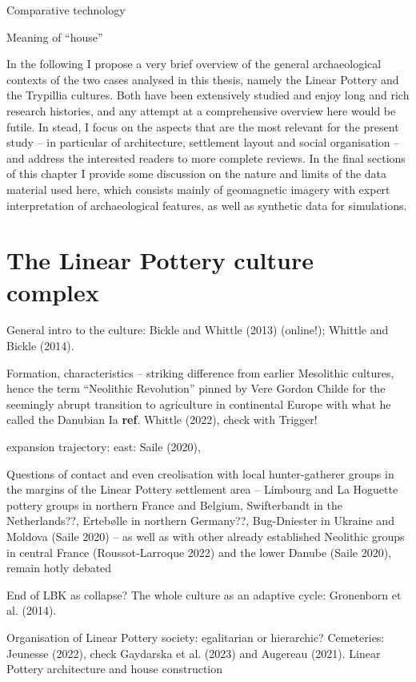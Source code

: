 \documentclass[
  12pt,
  a4paper, twoside]{book}
\begin{document}
Comparative technology

Meaning of ``house''

In the following I propose a very brief overview of the general archaeological contexts of the two cases analysed in this thesis, namely the Linear Pottery and the Trypillia cultures. Both have been extensively studied and enjoy long and rich research histories, and any attempt at a comprehensive overview here would be futile. In stead, I focus on the aspects that are the most relevant for the present study -- in particular of architecture, settlement layout and social organisation -- and address the interested readers to more complete reviews. In the final sections of this chapter I provide some discussion on the nature and limits of the data material used here, which consists mainly of geomagnetic imagery with expert interpretation of archaeological features, as well as synthetic data for simulations.

\hypertarget{lbk}{%
\section{The Linear Pottery culture complex}\label{lbk}}

General intro to the culture: Bickle and Whittle (2013) (online!); Whittle and Bickle (2014).

Formation, characteristics -- striking difference from earlier Mesolithic cultures, hence the term ``Neolithic Revolution'' pinned by Vere Gordon Childe for the seemingly abrupt transition to agriculture in continental Europe with what he called the Danubian Ia \textbf{ref}. Whittle (2022), check with Trigger!

expansion trajectory: east: Saile (2020),

Questions of contact and even creolisation with local hunter-gatherer groups in the margins of the Linear Pottery settlement area -- Limbourg and La Hoguette pottery groups in northern France and Belgium, Swifterbandt in the Netherlands??, Ertebølle in northern Germany??, Bug-Dniester in Ukraine and Moldova (Saile 2020) -- as well as with other already established Neolithic groups in central France (Roussot‑Larroque 2022) and the lower Danube (Saile 2020), remain hotly debated

End of LBK as collapse? The whole culture as an adaptive cycle: Gronenborn et al. (2014).

Organisation of Linear Pottery society: egalitarian or hierarchic? Cemeteries: Jeunesse (2022), check Gaydarska et al. (2023) and Augereau (2021). Linear Pottery architecture and house construction
\end{document}
